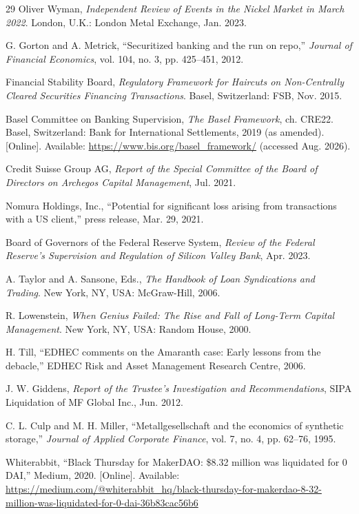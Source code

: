 \documentclass[11pt,a4paper]{article}
\begin{document}
\begin{thebibliography}{29}
 Oliver Wyman, \emph{Independent Review of Events in the Nickel Market in March 2022}. London, U.K.: London Metal Exchange, Jan. 2023.

 G. Gorton and A. Metrick, ``Securitized banking and the run on repo,'' \emph{Journal of Financial Economics}, vol. 104, no. 3, pp. 425--451, 2012.

 Financial Stability Board, \emph{Regulatory Framework for Haircuts on Non-Centrally Cleared Securities Financing Transactions}. Basel, Switzerland: FSB, Nov. 2015.

 Basel Committee on Banking Supervision, \emph{The Basel Framework}, ch. CRE22. Basel, Switzerland: Bank for International Settlements, 2019 (as amended). [Online]. Available: \url{https://www.bis.org/basel_framework/} (accessed Aug. 2026).

 Credit Suisse Group AG, \emph{Report of the Special Committee of the Board of Directors on Archegos Capital Management}, Jul. 2021.

 Nomura Holdings, Inc., ``Potential for significant loss arising from transactions with a US client,'' press release, Mar. 29, 2021.

 Board of Governors of the Federal Reserve System, \emph{Review of the Federal Reserve's Supervision and Regulation of Silicon Valley Bank}, Apr. 2023.

 A. Taylor and A. Sansone, Eds., \emph{The Handbook of Loan Syndications and Trading}. New York, NY, USA: McGraw-Hill, 2006.

 R. Lowenstein, \emph{When Genius Failed: The Rise and Fall of Long-Term Capital Management}. New York, NY, USA: Random House, 2000.

 H. Till, ``EDHEC comments on the Amaranth case: Early lessons from the debacle,'' EDHEC Risk and Asset Management Research Centre, 2006.

 J. W. Giddens, \emph{Report of the Trustee's Investigation and Recommendations}, SIPA Liquidation of MF Global Inc., Jun. 2012.

 C. L. Culp and M. H. Miller, ``Metallgesellschaft and the economics of synthetic storage,'' \emph{Journal of Applied Corporate Finance}, vol. 7, no. 4, pp. 62--76, 1995.

 Whiterabbit, ``Black Thursday for MakerDAO: \$8.32 million was liquidated for 0 DAI,'' Medium, 2020. [Online]. Available: \url{https://medium.com/@whiterabbit_hq/black-thursday-for-makerdao-8-32-million-was-liquidated-for-0-dai-36b83cac56b6}


\end{thebibliography}
\end{document}
